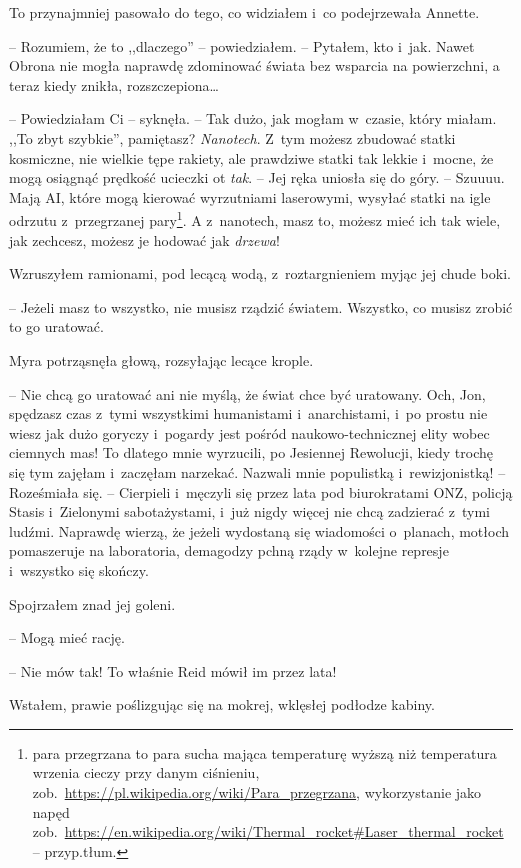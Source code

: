 \documentclass[oneside,polish,11pt,sfheadings]{mwbk}
\begin{document}
To przynajmniej pasowało do tego, co widziałem i~co podejrzewała
Annette.

-- Rozumiem, że to ,,dlaczego'' -- powiedziałem. -- Pytałem, kto i~jak. Nawet
Obrona nie mogła naprawdę zdominować świata bez wsparcia na powierzchni,
a teraz kiedy znikła, rozszczepiona\ldots

-- Powiedziałam Ci -- syknęła. -- Tak dużo, jak mogłam w~czasie, który
miałam. ,,To zbyt szybkie'', pamiętasz? \emph{Nanotech}. Z~tym możesz
zbudować statki kosmiczne, nie wielkie tępe rakiety, ale prawdziwe
statki tak lekkie i~mocne, że mogą osiągnąć prędkość ucieczki ot
\emph{tak}. -- Jej ręka uniosła się do góry. -- Szuuuu. Mają AI, które
mogą kierować wyrzutniami laserowymi, wysyłać statki na igle odrzutu z~przegrzanej pary\footnote{para przegrzana to para sucha mająca temperaturę
wyższą niż temperatura wrzenia cieczy przy danym ciśnieniu,
zob.~\url{https://pl.wikipedia.org/wiki/Para_przegrzana},
wykorzystanie jako napęd
zob.~\url{https://en.wikipedia.org/wiki/Thermal_rocket\#Laser_thermal_rocket
} -- przyp.tłum.}. A z~nanotech, masz to, możesz mieć ich tak wiele, jak
zechcesz, możesz je hodować jak \emph{drzewa}!

Wzruszyłem ramionami, pod lecącą wodą, z~roztargnieniem myjąc jej chude
boki.

-- Jeżeli masz to wszystko, nie musisz rządzić światem. Wszystko, co
musisz zrobić to go uratować.

Myra potrząsnęła głową, rozsyłając lecące krople. 

-- Nie chcą go uratować
ani nie myślą, że świat chce być uratowany. Och, Jon, spędzasz czas z~tymi wszystkimi humanistami i~anarchistami, i~po prostu nie wiesz jak
dużo goryczy i~pogardy jest pośród naukowo-technicznej elity wobec
ciemnych mas! To dlatego mnie wyrzucili, po Jesiennej Rewolucji, kiedy
trochę się tym zajęłam i~zaczęłam narzekać. Nazwali mnie populistką i~rewizjonistką! -- Roześmiała się. -- Cierpieli i~męczyli się przez lata
pod biurokratami ONZ, policją Stasis i~Zielonymi sabotażystami, i~już
nigdy więcej nie chcą zadzierać z~tymi ludźmi. Naprawdę wierzą, że
jeżeli wydostaną się wiadomości o~planach, motłoch pomaszeruje na
laboratoria, demagodzy pchną rządy w~kolejne represje i~wszystko się
skończy.

Spojrzałem znad jej goleni. 

-- Mogą mieć rację.

-- Nie mów tak! To właśnie Reid mówił im przez lata!

Wstałem, prawie poślizgując się na mokrej, wklęsłej podłodze kabiny.
\end{document}

